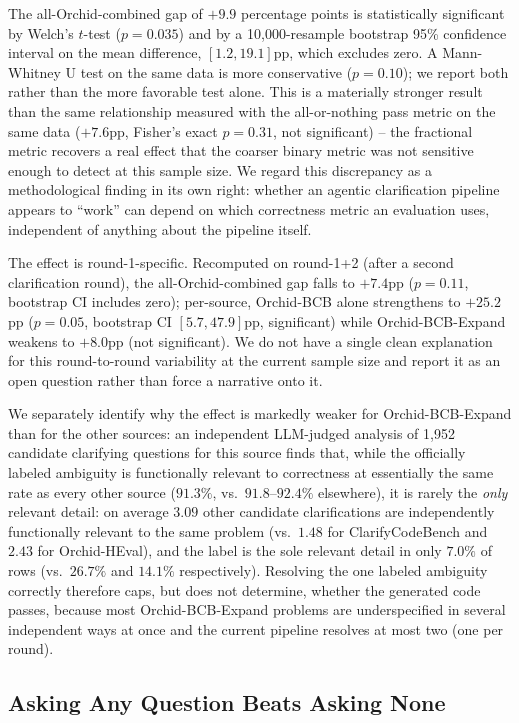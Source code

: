 The all-Orchid-combined gap of $+9.9$ percentage points is statistically
significant by Welch's $t$-test ($p = 0.035$) and by a 10,000-resample
bootstrap 95\% confidence interval on the mean difference, $[1.2, 19.1]$pp,
which excludes zero. A Mann-Whitney U test on the same data is more
conservative ($p = 0.10$); we report both rather than the more favorable
test alone. This is a materially stronger result than the same
relationship measured with the all-or-nothing pass metric on the same
data ($+7.6$pp, Fisher's exact $p = 0.31$, not significant) -- the
fractional metric recovers a real effect that the coarser binary metric
was not sensitive enough to detect at this sample size. We regard this
discrepancy as a methodological finding in its own right: whether an
agentic clarification pipeline appears to ``work'' can depend on which
correctness metric an evaluation uses, independent of anything about the
pipeline itself.

The effect is round-1-specific. Recomputed on round-1+2 (after a second
clarification round), the all-Orchid-combined gap falls to $+7.4$pp
($p = 0.11$, bootstrap CI includes zero); per-source, Orchid-BCB alone
strengthens to $+25.2$pp ($p = 0.05$, bootstrap CI $[5.7, 47.9]$pp,
significant) while Orchid-BCB-Expand weakens to $+8.0$pp (not
significant). We do not have a single clean explanation for this
round-to-round variability at the current sample size and report it as an
open question rather than force a narrative onto it.

We separately identify why the effect is markedly weaker for
Orchid-BCB-Expand than for the other sources: an independent LLM-judged
analysis of 1,952 candidate clarifying questions for this source finds
that, while the officially labeled ambiguity is functionally relevant to
correctness at essentially the same rate as every other source
($91.3\%$, vs.\ $91.8$--$92.4\%$ elsewhere), it is rarely the \emph{only}
relevant detail: on average $3.09$ other candidate clarifications are
independently functionally relevant to the same problem (vs.\ $1.48$ for
ClarifyCodeBench and $2.43$ for Orchid-HEval), and the label is the sole
relevant detail in only $7.0\%$ of rows (vs.\ $26.7\%$ and $14.1\%$
respectively). Resolving the one labeled ambiguity correctly therefore
caps, but does not determine, whether the generated code passes, because
most Orchid-BCB-Expand problems are underspecified in several independent
ways at once and the current pipeline resolves at most two (one per
round).

\subsection{Asking Any Question Beats Asking None}
\label{sec:results:any-question}

